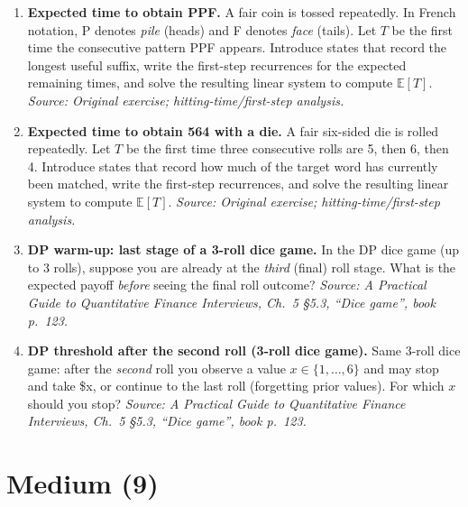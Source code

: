 \documentclass[11pt]{article}
\begin{document}
\begin{enumerate}[leftmargin=*, itemsep=0.9em]
\item \textbf{Expected time to obtain PPF.}  
A fair coin is tossed repeatedly. In French notation, P denotes \emph{pile} (heads) and F denotes \emph{face} (tails). Let $T$ be the first time the consecutive pattern PPF appears. Introduce states that record the longest useful suffix, write the first-step recurrences for the expected remaining times, and solve the resulting linear system to compute $\mathbb{E}[T]$.
\textit{Source: Original exercise; hitting-time/first-step analysis.}

\item \textbf{Expected time to obtain 564 with a die.}  
A fair six-sided die is rolled repeatedly. Let $T$ be the first time three consecutive rolls are 5, then 6, then 4. Introduce states that record how much of the target word has currently been matched, write the first-step recurrences, and solve the resulting linear system to compute $\mathbb{E}[T]$.
\textit{Source: Original exercise; hitting-time/first-step analysis.}

\item \textbf{DP warm-up: last stage of a 3-roll dice game.}  
In the DP dice game (up to 3 rolls), suppose you are already at the \emph{third} (final) roll stage. What is the expected payoff \emph{before} seeing the final roll outcome?  
\textit{Source: A Practical Guide to Quantitative Finance Interviews, Ch.\ 5 \S5.3, ``Dice game'', book p.\ 123.}

\item \textbf{DP threshold after the second roll (3-roll dice game).}  
Same 3-roll dice game: after the \emph{second} roll you observe a value $x\in\{1,\dots,6\}$ and may stop and take \$x, or continue to the last roll (forgetting prior values). For which $x$ should you stop?  
\textit{Source: A Practical Guide to Quantitative Finance Interviews, Ch.\ 5 \S5.3, ``Dice game'', book p.\ 123.}

\end{enumerate}

\section*{Medium (9)}
\end{document}
